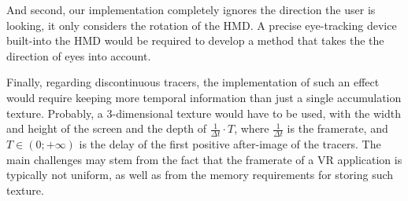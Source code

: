 And second, our implementation completely ignores the direction the user is looking, it only considers the rotation of the \ac{HMD}. A precise eye-tracking device built-into the \ac{HMD} would be required to develop a method that takes the the direction of eyes into account.

Finally, regarding discontinuous tracers, the implementation of such an effect would require keeping more temporal information than just a single accumulation texture. Probably, a 3-dimensional texture would have to be used, with the width and height of the screen and the depth of $\frac{1}{\Delta t} \cdot T$, where $\frac{1}{\Delta t}$ is the framerate, and $T \in (0; +\infty)$ is the delay of the first positive after-image of the tracers. The main challenges may stem from the fact that the framerate of a \ac{VR} application is typically not uniform, as well as from the memory requirements for storing such texture.

